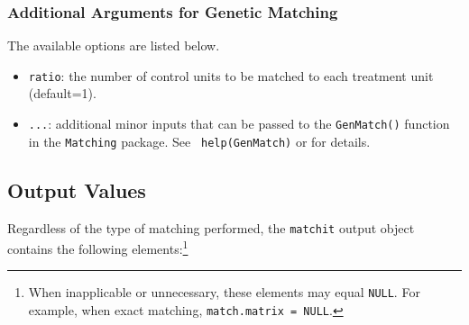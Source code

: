 \subsubsection{Additional Arguments for Genetic Matching}
\label{subsubsec:inputs-genetic}

The available options are listed below.
\begin{itemize}
\item {\tt ratio}: the number of control units to be matched
  to each treatment unit (default=1). 
\item {\tt ...}: additional minor inputs that can be passed to the
  {\tt GenMatch()} function in the {\tt Matching} package. See {\tt
    help(GenMatch)} or
  for details.
\end{itemize}


\subsection{Output Values}
\label{sec:outputs}

Regardless of the type of matching performed, the \texttt{matchit}
output object contains the following elements:\footnote{When
inapplicable or unnecessary, these elements may equal {\tt NULL}.  For
example, when exact matching, {\tt match.matrix = NULL}.}

